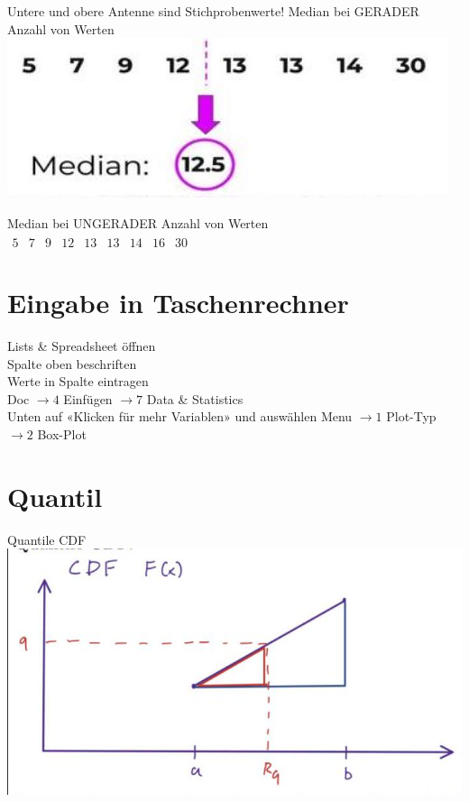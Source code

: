 \documentclass[10pt]{article}
\begin{document}
Untere und obere Antenne sind Stichprobenwerte! Median bei GERADER Anzahl von Werten\\
\includegraphics[max width=\textwidth, center]{2024_12_29_0906b02acf849bda8665g-1(7)}

Median bei UNGERADER Anzahl von Werten\\
$\begin{array}{llllllllllllllll}5 & 7 & 9 & 12 & 13 & 13 & 14 & 16 & 30\end{array}$

\section*{Eingabe in Taschenrechner}
Lists \& Spreadsheet öffnen\\
Spalte oben beschriften\\
Werte in Spalte eintragen\\
Doc $\rightarrow 4$ Einfügen $\rightarrow 7$ Data \& Statistics\\
Unten auf «Klicken für mehr Variablen» und auswählen Menu $\rightarrow 1$ Plot-Typ $\rightarrow 2$ Box-Plot

\section*{Quantil}
Quantile CDF\\
\includegraphics[max width=\textwidth, center]{2024_12_29_0906b02acf849bda8665g-1(2)}
\end{document}
